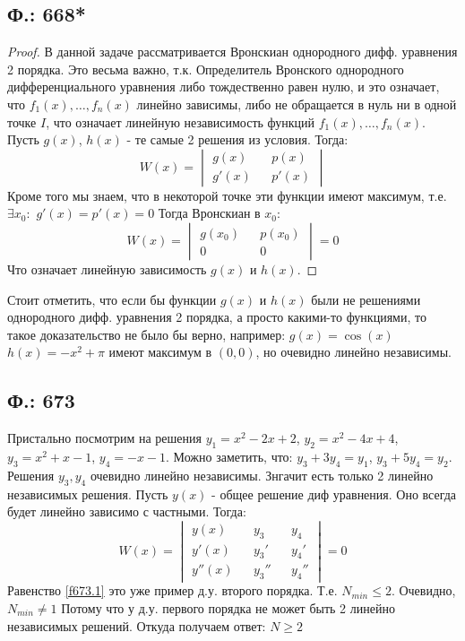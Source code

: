 \documentclass{article}
\begin{document}
 \subsection{Ф.: 668*}
 \begin{proof}

 В данной задаче рассматривается Вронскиан однородного дифф. уравнения 2 порядка. Это весьма важно, т.к. Определитель Вронского однородного дифференциального уравнения либо тождественно равен нулю, и это означает, что $f_{1}(x),\ldots ,f_{n}(x)$ линейно зависимы, либо не обращается в нуль ни в одной точке $I$, что означает линейную независимость функций $ f_{1}(x),\ldots ,f_{n}(x)$. Пусть $g(x)$, $h(x)$ - те самые 2 решения из условия. Тогда:
 \begin{equation}
     W(x)=
     \begin{vmatrix}
      g(x) && p(x) \\
      g'(x) && p'(x)
     \end{vmatrix}
 \end{equation}
Кроме того мы знаем, что в некоторой точке эти функции имеют максимум, т.е. $\exists x_0:$ $g'(x) = p'(x) = 0$ Тогда Вронскиан в $x_0$:
 \begin{equation}
     W(x)=
     \begin{vmatrix}
      g(x_0) && p(x_0) \\
      0 && 0
     \end{vmatrix}
     =0
 \end{equation}
 Что означает линейную зависимость $g(x)$ и $h(x)$.
\end{proof}
Стоит отметить, что если бы функции $g(x)$ и $h(x)$ были не решениями однородного дифф. уравнения 2 порядка, а просто какими-то функциями, то такое доказательство не было бы верно, например: $g(x)=\cos(x)$ $h(x)=-x^2+\pi$ имеют максимум в $(0,0)$, но очевидно линейно независимы.
\subsection{Ф.: 673}
Пристально посмотрим на решения $y_1=x^2-2x+2$, $y_2=x^2-4x+4$, $y_3=x^2+x-1$, $y_4=-x-1$. Можно заметить, что: $y_3+3 y_4=y_1$, $y_3+5 y_4=y_2$. Решения $y_3, y_4$ очевидно линейно независимы. Знгачит есть только 2 линейно независимых решения. Пусть $y(x)$ - общее решение диф уравнения. Оно всегда будет линейно зависимо с частными. Тогда:
\begin{equation}\label{f673.1}
    W(x)=
    \begin{vmatrix}
     y(x)&& y_3 && y_4\\
     y'(x)&& y_3' && y_4'\\
     y''(x)&& y_3'' && y_4''
    \end{vmatrix}
    =0
\end{equation}
Равенство \ref{f673.1} это уже пример д.у. второго порядка. Т.е. $N_{min} \leq 2$. Очевидно, $N_{min} \neq 1$ Потому что у д.у. первого порядка не может быть 2 линейно независимых решений. Откуда получаем ответ: $N\geq 2$
\end{document}
